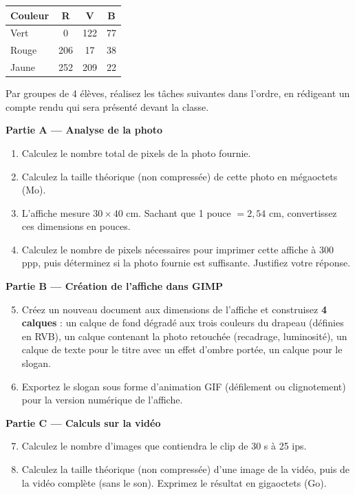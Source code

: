 \documentclass[11pt]{article}
\newcounter{popsec}
\newcounter{popsub}
\newcommand{\courssub}[1]{%
  \stepcounter{popsub}%
  \par\vspace{9pt}\noindent{\popxbold\fontsize{11.5}{13}\selectfont\color{popink}{\color{poporange}\thepopsec.\thepopsub}\hspace{6pt}#1}\par\nopagebreak\vspace{4pt}
}
\begin{document}
\begin{center}
\begin{tabular}{|l|c|c|c|}
\hline
\rowcolor{popblueL}
\textbf{Couleur} & \textbf{R} & \textbf{V} & \textbf{B} \\
\hline
Vert & 0 & 122 & 77 \\
Rouge & 206 & 17 & 38 \\
Jaune & 252 & 209 & 22 \\
\hline
\end{tabular}
\end{center}

\courssub{Consignes}

Par groupes de 4 élèves, réalisez les tâches suivantes dans l'ordre, en rédigeant un compte rendu qui sera présenté devant la classe.

\textbf{Partie A — Analyse de la photo}

\begin{enumerate}
  \item Calculez le nombre total de pixels de la photo fournie.
  \item Calculez la taille théorique (non compressée) de cette photo en mégaoctets (Mo).
  \item L'affiche mesure $30 \times 40$ cm. Sachant que 1 pouce $= 2,54$ cm, convertissez ces dimensions en pouces.
  \item Calculez le nombre de pixels nécessaires pour imprimer cette affiche à 300 ppp, puis déterminez si la photo fournie est suffisante. Justifiez votre réponse.
\end{enumerate}

\textbf{Partie B — Création de l'affiche dans GIMP}

\begin{enumerate}
  \setcounter{enumi}{4}
  \item Créez un nouveau document aux dimensions de l'affiche et construisez \textbf{4 calques} : un calque de fond dégradé aux trois couleurs du drapeau (définies en RVB), un calque contenant la photo retouchée (recadrage, luminosité), un calque de texte pour le titre avec un effet d'ombre portée, un calque pour le slogan.
  \item Exportez le slogan sous forme d'animation GIF (défilement ou clignotement) pour la version numérique de l'affiche.
\end{enumerate}

\textbf{Partie C — Calculs sur la vidéo}

\begin{enumerate}
  \setcounter{enumi}{6}
  \item Calculez le nombre d'images que contiendra le clip de 30 s à 25 ips.
  \item Calculez la taille théorique (non compressée) d'une image de la vidéo, puis de la vidéo complète (sans le son). Exprimez le résultat en gigaoctets (Go).
\end{enumerate}
\end{document}
